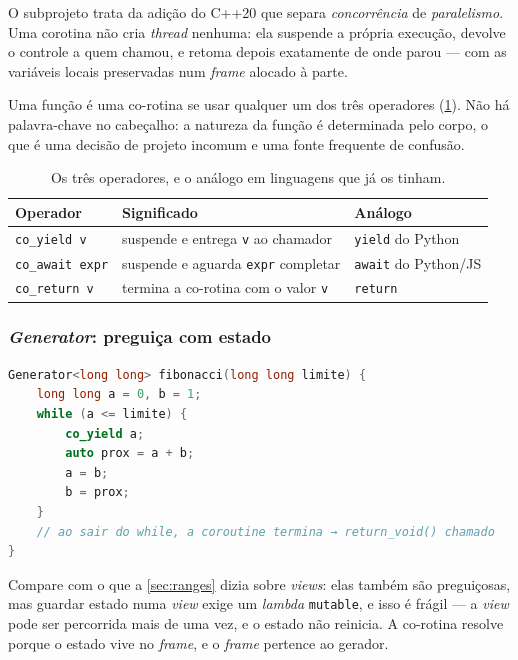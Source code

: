 O subprojeto  trata da adição do C++20 que separa
\emph{concorrência} de \emph{paralelismo}. Uma \gls{corotina} não cria
\emph{thread} nenhuma: ela suspende a própria execução, devolve o controle a
quem chamou, e retoma depois exatamente de onde parou --- com as variáveis
locais preservadas num \emph{frame} alocado à parte.

Uma função é uma co-rotina se usar qualquer um dos três operadores
(\cref{tab:operadores-corotina}). Não há palavra-chave no cabeçalho: a natureza
da função é determinada pelo corpo, o que é uma decisão de projeto incomum e
uma fonte frequente de confusão.

\begin{table}[htbp]
\centering
\caption{Os três operadores, e o análogo em linguagens que já os tinham.}
\label{tab:operadores-corotina}
\footnotesize
\begin{tabular}{@{}lll@{}}
\toprule
\textbf{Operador} & \textbf{Significado} & \textbf{Análogo} \\
\midrule
\texttt{co\_yield v}   & suspende e entrega \texttt{v} ao chamador & \texttt{yield} do Python \\
\texttt{co\_await expr}& suspende e aguarda \texttt{expr} completar & \texttt{await} do Python/JS \\
\texttt{co\_return v}  & termina a co-rotina com o valor \texttt{v} & \texttt{return} \\
\bottomrule
\end{tabular}
\end{table}

\subsubsection{\emph{Generator}: preguiça com estado}

\begin{lstlisting}[style=bt, language=C++,
    caption={Um gerador infinito recortado por um limite, em
             \texttt{src/coroutines/demo\_generator.hpp}.}]
Generator<long long> fibonacci(long long limite) {
    long long a = 0, b = 1;
    while (a <= limite) {
        co_yield a;
        auto prox = a + b;
        a = b;
        b = prox;
    }
    // ao sair do while, a coroutine termina → return_void() chamado
}
\end{lstlisting}

Compare com o que a \cref{sec:ranges} dizia sobre \emph{views}: elas também são
preguiçosas, mas guardar estado numa \emph{view} exige um \emph{lambda}
\texttt{mutable}, e isso é frágil --- a \emph{view} pode ser percorrida mais de
uma vez, e o estado não reinicia. A co-rotina resolve porque o estado vive no
\emph{frame}, e o \emph{frame} pertence ao gerador.

